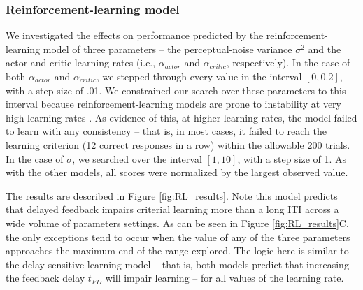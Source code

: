 \documentclass[doc, floatsintext]{apa7}
\begin{document}
\subsubsection{Reinforcement-learning model}
We investigated the effects on performance predicted by the
reinforcement-learning model of three parameters -- the
perceptual-noise variance $\sigma^2$ and the actor and
critic learning rates (i.e., $\alpha_{actor}$ and
$\alpha_{critic}$, respectively). In the case of both
$\alpha_{actor}$ and $\alpha_{critic}$, we stepped through
every value in the interval $[0, 0.2]$, with a step size of
.01. We constrained our search over these parameters to this
interval because reinforcement-learning models are prone to
instability at very high learning rates
\parencite{SuttonBarto1998}. As evidence of this, at higher
learning rates, the model failed to learn with any
consistency -- that is, in most cases, it failed to reach
the learning criterion (12 correct responses in a row)
within the allowable 200 trials. In the case of $\sigma$, we
searched over the interval $[1, 10]$, with a step size of 1.
As with the other models, all scores were normalized by the
largest observed value.

The results are described in Figure \ref{fig:RL_results}.
Note this model predicts that delayed feedback impairs
criterial learning more than a long ITI across a wide volume
of parameters settings. As can be seen in Figure
\ref{fig:RL_results}C, the only exceptions tend to occur
when the value of any of the three parameters approaches the
maximum end of the range explored. The logic here is similar
to the delay-sensitive learning model -- that is, both
models predict that increasing the feedback delay $t_{FD}$
will impair learning -- for all values of the learning rate.
\end{document}
